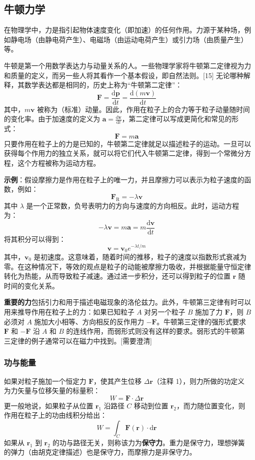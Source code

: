 \subsection{牛顿力学}  
在物理学中，力是指引起物体速度变化（即加速）的任何作用。力源于某种场，例如静电场（由静电荷产生）、电磁场（由运动电荷产生）或引力场（由质量产生）等。  

牛顿是第一个用数学表达力与动量关系的人。一些物理学家将牛顿第二定律视为力和质量的定义，而另一些人将其看作一个基本假设，即自然法则。[15] 无论哪种解释，其数学表达都是相同的，历史上称为“牛顿第二定律”：  
\[
\mathbf{F} = \frac{\mathrm{d} \mathbf{p}}{\mathrm{d} t} = \frac{\mathrm{d} (m\mathbf{v})}{\mathrm{d} t}~
\] 
其中，\( m\mathbf{v} \) 被称为（标准）动量。因此，作用在粒子上的合力等于粒子动量随时间的变化率。由于加速度的定义为 \( \mathbf{a} = \frac{\mathrm{d} \mathbf{v}}{\mathrm{d} t} \)，第二定律可以写成更简化和常见的形式：  
\[
\mathbf{F} = m\mathbf{a}~
\]  
只要作用在粒子上的力是已知的，牛顿第二定律就足以描述粒子的运动。一旦可以获得每个作用力的独立关系，就可以将它们代入牛顿第二定律，得到一个常微分方程，这个方程被称为运动方程。  

\textbf{示例}：假设摩擦力是作用在粒子上的唯一力，并且摩擦力可以表示为粒子速度的函数，例如：  
\[
\mathbf{F}_{\mathrm{R}} = -\lambda \mathbf{v}~
\]  
其中 \( \lambda \) 是一个正常数，负号表明力的方向与速度的方向相反。此时，运动方程为：  
\[
-\lambda \mathbf{v} = m\mathbf{a} = m\frac{\mathrm{d} \mathbf{v}}{\mathrm{d} t}~
\]  
将其积分可以得到：  
\[
\mathbf{v} = \mathbf{v}_0 e^{-\lambda t / m}~
\]  
其中，\( \mathbf{v}_0 \) 是初速度。这意味着，随着时间的推移，粒子的速度以指数形式衰减为零。在这种情况下，等效的观点是粒子的动能被摩擦力吸收，并根据能量守恒定律转化为热能，从而导致粒子减速。通过进一步积分，还可以得到粒子的位置 \( \mathbf{r} \) 随时间的变化关系。  

\textbf{重要的力}包括引力和用于描述电磁现象的洛伦兹力。此外，牛顿第三定律有时可以用来推导作用在粒子上的力：如果已知粒子 \( A \) 对另一个粒子 \( B \) 施加了力 \( \mathbf{F} \)，则 \( B \) 必须对 \( A \) 施加大小相等、方向相反的反作用力 \( -\mathbf{F} \)。牛顿第三定律的强形式要求 \( \mathbf{F} \) 和 \( -\mathbf{F} \) 沿 \( A \) 和 \( B \) 的连线作用，而弱形式则没有这样的要求。弱形式的牛顿第三定律的例子通常可以在磁力中找到。[需要澄清]  
\subsubsection{功与能量} 
如果对粒子施加一个恒定力 \( \mathbf{F} \)，使其产生位移 \( \Delta \mathbf{r} \)（注释 1），则力所做的功定义为力矢量与位移矢量的标量积：  
\[
W = \mathbf{F} \cdot \Delta \mathbf{r}~
\]  
更一般地说，如果粒子从位置 \( \mathbf{r}_1 \) 沿路径 \( C \) 移动到位置 \( \mathbf{r}_2 \)，而力随位置变化，则作用在粒子上的功由线积分给出：  
\[
W = \int_{C} \mathbf{F}(\mathbf{r}) \cdot \mathrm{d} \mathbf{r}~
\]  
如果从 \( \mathbf{r}_1 \) 到 \( \mathbf{r}_2 \) 的功与路径无关，则称该力为\textbf{保守力}。重力是保守力，理想弹簧的弹力（由胡克定律描述）也是保守力，而摩擦力是非保守力。  

